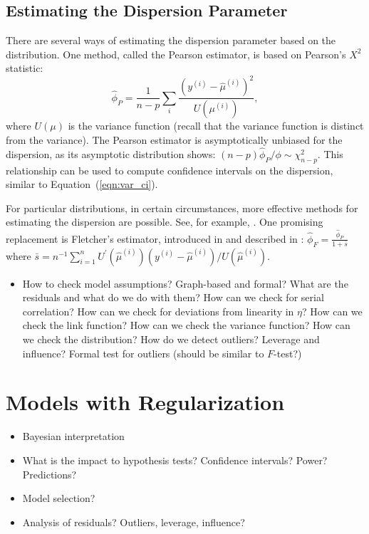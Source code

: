 \documentclass[12pt]{article}
\begin{document}
\subsection{Estimating the Dispersion Parameter}
There are several ways of estimating the dispersion parameter based on the distribution. One method, called the Pearson estimator, is based on Pearson's $X^2$ statistic:
\begin{displaymath}
   \hat{\phi}_P = \frac{1}{n-p} \sum_i \frac{(y^{(i)} - \hat{\mu}^{(i)})^2}{U(\mu^{(i)})},
\end{displaymath}
where $U(\mu)$ is the variance function (recall that the variance function is distinct from the variance). The Pearson estimator is asymptotically unbiased for the dispersion, as its asymptotic distribution shows: $(n-p)\hat{\phi}_P / \phi \sim \chi_{n-p}^2$. This relationship can be used to compute confidence intervals on the dispersion, similar to Equation~(\ref{eqn:var_ci}).

For particular distributions, in certain circumstances, more effective methods for estimating the dispersion are possible. See, for example, \cite[\S 4.5.2, \S 6.2.4, and \S 8.3.6]{MN:1983}. One promising replacement is Fletcher's estimator, introduced in \cite{Fletcher:12} and described in \cite[\S 3.1.5]{Wood:2017}: $\hat{\phi}_F = \frac{\hat{\phi}_P}{1 + \bar{s}}$ where $\bar{s}=n^{-1} \sum_{i=1}^n U^\prime(\hat{\mu}^{(i)}) (y^{(i)} - \hat{\mu}^{(i)})/U(\hat{\mu}^{(i)})$.

\begin{itemize}
\item How to check model assumptions? Graph-based and formal? What are the residuals and what do we do with them? How can we check for serial correlation? How can we check for deviations from linearity in $\eta$? How can we check the link function? How can we check the variance function? How can we check the distribution? How do we detect outliers? Leverage and influence? Formal test for outliers (should be similar to $F$-test?)
\end{itemize}

\section{Models with Regularization}
\label{app:regularization}

\begin{itemize}
\item Bayesian interpretation
\item What is the impact to hypothesis tests? Confidence intervals? Power? Predictions?
\item Model selection?
\item Analysis of residuals? Outliers, leverage, influence?
\end{itemize}

\newpage

\end{document}
